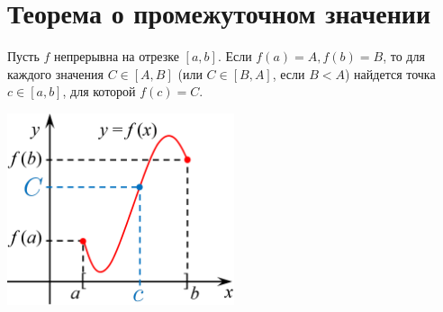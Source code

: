 	\section{Теорема о промежуточном значении}
	
	\begin{theorem}[Коши]
		Пусть $f$ непрерывна на отрезке $[a, b]$. Если $f(a) = A, f(b) = B$, то для каждого значения $C \in [A, B]$ (или $C \in [B, A]$, если $B < A$) найдется точка $c \in [a, b]$, для которой $f(c) = C$.
	\end{theorem}
	
	\begin{center}
		\includegraphics[width=0.5\textwidth]{img/lecture13/intermediate_value_theorem}
	\end{center}
	
